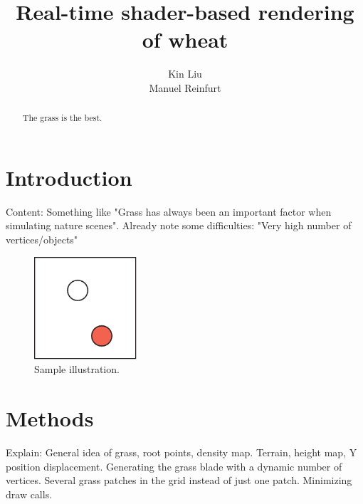 \documentclass[conference]{acmsiggraph}
\title{Real-time shader-based rendering of wheat}
\author {Kin Liu\\Manuel Reinfurt}
\begin{document}

\maketitle

\begin{abstract}

The grass is the best.

\end{abstract}

\TOGlinkslist


\copyrightspace

\section{Introduction}

Content: Something like "Grass has always been an important factor when simulating nature scenes". Already note some difficulties: "Very high number of vertices/objects"

\begin{figure}[ht]
  \centering
  \includegraphics[width=1.5in]{images/samplefigure}
  \caption{Sample illustration.}
\end{figure}

\section{Methods}

Explain: General idea of grass, root points, density map. Terrain, height map, Y position displacement. Generating the grass blade with a dynamic number of vertices. Several grass patches in the grid instead of just one patch. Minimizing draw calls.
\end{document}
